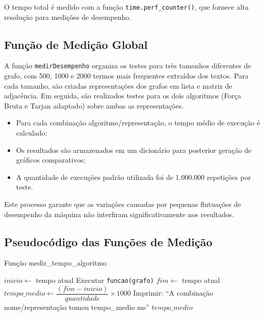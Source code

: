 \documentclass[12pt]{article}
\begin{document}
O tempo total é medido com a função \texttt{time.perf\_counter()}, que fornece alta resolução para medições de desempenho.

\subsection{Função de Medição Global}

A função \texttt{medirDesempenho} organiza os testes para três tamanhos diferentes de grafo, com 500, 1000 e 2000 termos mais frequentes extraídos dos textos. Para cada tamanho, são criadas representações dos grafos em lista e matriz de adjacência. Em seguida, são realizados testes para os dois algoritmos (Força Bruta e Tarjan adaptado) sobre ambas as representações.

\begin{itemize}
    \item Para cada combinação algoritmo/representação, o tempo médio de execução é calculado;
    \item Os resultados são armazenados em um dicionário para posterior geração de gráficos comparativos;
    \item A quantidade de execuções padrão utilizada foi de 1.000.000 repetições por teste.
\end{itemize}

Este processo garante que as variações causadas por pequenas flutuações de desempenho da máquina não interfiram significativamente nos resultados.

\subsection{Pseudocódigo das Funções de Medição}

\begin{algorithm}[H]
\caption{Função medir\_tempo\_algoritmo}
\begin{algorithmic}[1]
    \State $inicio \gets$ tempo atual
        \State Executar \texttt{funcao(grafo)}
    \EndFor
    \State $fim \gets$ tempo atual
    \State $tempo\_medio \gets \dfrac{(fim - inicio)}{quantidade} \times 1000$
    \State Imprimir: ``A combinação nome/representação tomou tempo\_medio ms''
    \State \Return $tempo\_medio$
\EndFunction
\end{algorithmic}
\end{algorithm}
\end{document}
